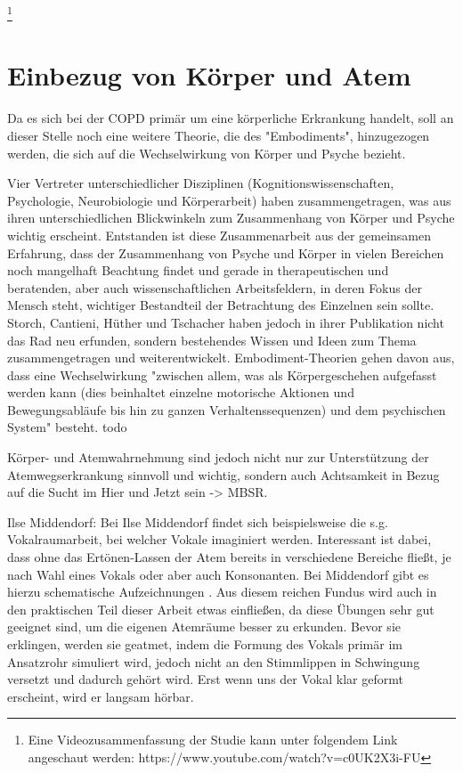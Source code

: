 \footnote{Eine Videozusammenfassung der Studie kann unter folgendem Link angeschaut werden: https://www.youtube.com/watch?v=c0UK2X3i-FU}

\section{Einbezug von Körper und Atem} 
\label{section:einbezug von koerper und atem}
Da es sich bei der COPD primär um eine körperliche Erkrankung handelt, soll an dieser Stelle noch eine weitere Theorie, die des "Embodiments", hinzugezogen werden, die sich auf die Wechselwirkung von Körper und Psyche bezieht. 

Vier Vertreter unterschiedlicher Disziplinen (Kognitionswissenschaften, Psychologie, Neurobiologie und Körperarbeit) haben zusammengetragen, was aus ihren unterschiedlichen Blickwinkeln zum Zusammenhang von Körper und Psyche wichtig erscheint. Entstanden ist diese Zusammenarbeit aus der gemeinsamen Erfahrung, dass der Zusammenhang von Psyche und Körper in vielen Bereichen noch mangelhaft Beachtung findet und gerade in therapeutischen und beratenden, aber auch wissenschaftlichen Arbeitsfeldern, in deren Fokus der Mensch steht, wichtiger Bestandteil der Betrachtung des Einzelnen sein sollte.
Storch, Cantieni, Hüther und Tschacher haben jedoch in ihrer Publikation nicht das Rad neu erfunden, sondern bestehendes Wissen und Ideen zum Thema zusammengetragen und weiterentwickelt. Embodiment-Theorien gehen davon aus, dass eine Wechselwirkung "zwischen allem, was als Körpergeschehen aufgefasst werden kann (dies beinhaltet einzelne motorische Aktionen und Bewegungsabläufe bis hin zu ganzen Verhaltenssequenzen) und dem psychischen System" \autocite[39]{hüther2010} besteht. todo

Körper- und Atemwahrnehmung sind jedoch nicht nur zur Unterstützung der Atemwegserkrankung sinnvoll und wichtig, sondern auch Achtsamkeit in Bezug auf die Sucht im Hier und Jetzt sein -> MBSR.

Ilse Middendorf: Bei Ilse Middendorf findet sich beispielsweise die s.g. Vokalraumarbeit, bei welcher Vokale imaginiert werden. Interessant ist dabei, dass ohne das Ertönen-Lassen der Atem bereits in verschiedene Bereiche fließt, je nach Wahl eines Vokals oder aber auch Konsonanten. Bei Middendorf gibt es hierzu schematische Aufzeichnungen \autocite[vgl.][60ff.]{middendorf1995}. Aus diesem reichen Fundus wird auch in den praktischen Teil dieser Arbeit etwas einfließen, da diese Übungen sehr gut geeignet sind, um die eigenen Atemräume besser zu erkunden. Bevor sie erklingen, werden sie geatmet, indem die Formung des Vokals primär im Ansatzrohr simuliert wird, jedoch nicht an den Stimmlippen in Schwingung versetzt und dadurch gehört wird. Erst wenn uns der Vokal klar geformt erscheint, wird er langsam hörbar. 

